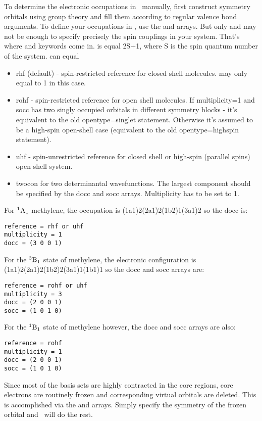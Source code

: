 To determine the electronic occupations in \PSIthree\ manually, first
construct symmetry orbitals using group theory and fill them according
to regular valence bond arguments. To define your occupations in
\PSIthree, use the  and  arrays. But only
 and  may not be enough to specify
precisely the spin couplings in your system. That's where
 and  keywords come
in.  is equal 2S+1, where S is the spin quantum
number of the system.  can equal
\begin{itemize}
\item rhf (default) - spin-restricted reference for closed shell molecules.
       may only equal to 1 in this case.
\item rohf - spin-restricted reference for open shell molecules.
      If multiplicity=1 and socc has two singly occupied orbitals in
      different symmetry blocks - it's equivalent to the old 
      opentype=singlet statement.  Otherwise it's assumed to be a 
      high-spin open-shell case (equivalent to the old
      opentype=highspin statement).
\item uhf - spin-unrestricted reference for closed shell or 
      high-spin (parallel spins) open shell system.
\item twocon for two determinantal wavefunctions. The largest
      component should be specified by the docc and socc arrays.  
      Multiplicity has to be set to 1.
\end{itemize}
For $^1{\rm A}_1$ methylene, the occupation is
(1a1)2(2a1)2(1b2)1(3a1)2 so the docc is:
\begin{verbatim}
reference = rhf or uhf
multiplicity = 1
docc = (3 0 0 1)
\end{verbatim}
For the $^3{\rm B}_1$ state of methylene, the electronic configuration
is (1a1)2(2a1)2(1b2)2(3a1)1(1b1)1 so the docc and socc arrays are:
\begin{verbatim}
reference = rohf or uhf
multiplicity = 3
docc = (2 0 0 1)
socc = (1 0 1 0)
\end{verbatim}
For the $^1{\rm B}_1$ state of methylene however, the docc and socc
arrays are also:
\begin{verbatim}
reference = rohf
multiplicity = 1
docc = (2 0 0 1)
socc = (1 0 1 0)
\end{verbatim}
Since most of the basis sets are highly contracted in the core regions,
core electrons are routinely frozen and corresponding virtual
orbitals are deleted. This is accomplished via the 
and  arrays. Simply specify the symmetry of
the frozen orbital and \PSIthree\ will do the rest. 

